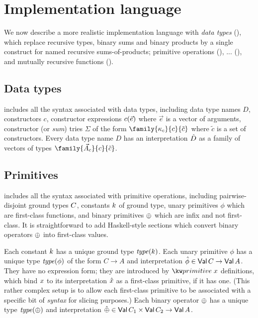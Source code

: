 \section{Implementation language}

We now describe a more realistic implementation language with \emph{data types}
(), which replace recursive types, binary
sums and binary products by a single construct for named recursive
sums-of-products; primitive operations
(), ...
(), and mutually recursive functions
().

\subsection{Data types}
\label{sec:impl-language:data-types}

 includes all the syntax associated with data
types, including data type names $D$, constructors $c$, constructor expressions
$c(\vec{e})$ where $\vec{e}$ is a vector of arguments, constructor
(or \emph{sum}) tries $\Sigma$ of the form $\family{\kappa_c}{c}{\tilde{c}}$
where $\tilde{c}$ is a set of constructors. Every data type name $D$ has an
interpretation $\hat{D}$ as a family of vectors of types
$\family{\vec{A}_c}{c}{\tilde{c}}$.

\subsection{Primitives}
\label{sec:impl-language:primitives}




 includes all the syntax associated with primitive
operations, including pairwise-disjoint ground types $C$, constants
$k$ of ground type, unary primitives $\phi$ which are first-class
functions, and binary primitives $\oplus$ which are infix and not first-class.
It is straightforward to add Haskell-style sections which convert binary
operators $\oplus$ into first-class values.

Each constant $k$ has a unique ground type $\operatorname{\mathit{type}}(k)$.
Each unary primitive $\phi$ has a unique type $\operatorname{\mathit{type}}(\phi)$ of the form $C \to
A$ and interpretation $\hat{\phi} \in \textup{\textsf{Val}}\,C \to \textup{\textsf{Val}}\,A$. They have no
expression form; they are introduced by $\exPrimDef{\exVar{x}}$ definitions,
which bind $x$ to its interpretation $\hat{x}$ as a
first-class primitive, if it has one. (This rather complex setup is to allow
each first-class primitive to be associated with a specific bit of \emph{syntax}
for slicing purposes.) Each binary operator $\oplus$ has a unique type
$\operatorname{\mathit{type}}(\oplus)$ and interpretation $\hat{\oplus} \in \textup{\textsf{Val}}\,C_1 \times
\textup{\textsf{Val}}\,C_2 \to \textup{\textsf{Val}}\,A$.

